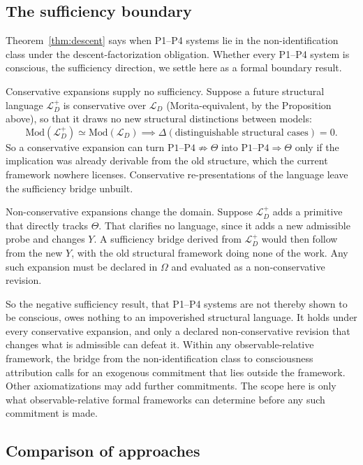 \documentclass[11pt]{article}
\begin{document}
\subsection{The sufficiency boundary}
\label{sec:sufficiency}

Theorem~\ref{thm:descent} says when P1--P4 systems lie in the non-identification
class under the descent-factorization obligation. Whether every P1--P4 system is
conscious, the sufficiency direction, we settle here as a formal boundary
result.

Conservative expansions supply no sufficiency. Suppose a future structural
language $\mathcal{L}_D^+$ is conservative over $\mathcal{L}_D$
(Morita-equivalent, by the Proposition above), so that it draws no new structural
distinctions between models:
\[
\mathrm{Mod}(\mathcal{L}_D^+) \simeq \mathrm{Mod}(\mathcal{L}_D)
\implies \Delta(\text{distinguishable structural cases}) = 0.
\]
So a conservative expansion can turn
$\mathrm{P1\text{--}P4} \not\Rightarrow \Theta$ into
$\mathrm{P1\text{--}P4} \Rightarrow \Theta$ only if the implication was already
derivable from the old structure, which the current framework nowhere
licenses. Conservative re-presentations of the language leave the sufficiency
bridge unbuilt.

Non-conservative expansions change the domain. Suppose
$\mathcal{L}_D^+$ adds a primitive that directly tracks $\Theta$. That clarifies
no language, since it adds a new admissible probe and changes
$Y$. A sufficiency bridge derived from $\mathcal{L}_D^+$ would then follow from
the new
$Y$, with the old structural framework doing none of the work. Any such
expansion must be declared in $\Omega$ and evaluated as a non-conservative
revision.

So the negative sufficiency result, that P1--P4 systems are not thereby shown to
be conscious, owes nothing to an impoverished structural language. It holds
under every conservative expansion, and only a declared non-conservative
revision that changes what is admissible can defeat it. Within any
observable-relative framework, the bridge from the non-identification class to
consciousness attribution calls for an exogenous commitment that lies outside
the framework. Other axiomatizations may add further commitments. The scope here
is only what observable-relative formal frameworks can determine before any
such commitment is made.

\subsection{Comparison of approaches}
\end{document}
